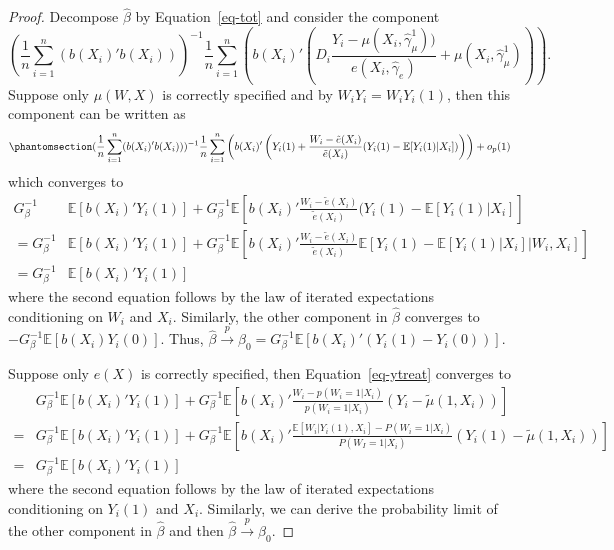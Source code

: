 \documentclass[
  12pt,
  12pt]{article}
\numberwithin{equation}{section}
\theoremstyle{definition}
\theoremstyle{plain}
\theoremstyle{plain}
\theoremstyle{remark}
\begin{document}
\begin{proof}
Decompose \(\hat\beta\) by Equation~\ref{eq-tot} and consider the
component \[
(\frac1n\sum_{i = 1}^{n}(b(X_i)'b(X_i)))^{-1}\frac1n\sum_{i = 1}^{n}\left(b(X_i)'\left(D_i\frac{Y_i - \mu(X_i, \hat\gamma^1_\mu))}{e(X_i, \hat\gamma_e)} + \mu(X_i, \hat\gamma^1_\mu)\right)\right).
\] Suppose only \(\mu(W, X)\) is correctly specified and by
\(W_iY_i = W_iY_i(1)\), then this component can be written as
\begin{equation}\phantomsection\label{eq-ytreat}{
(\frac1n\sum_{i = 1}^{n}(b(X_i)'b(X_i)))^{-1}\frac1n\sum_{i = 1}^{n}\left(b(X_i)'\left(Y_i(1) + \frac{W_i - \tilde{e}(X_i)}{\tilde{e}(X_i)}(Y_i(1) - \mathbb{E}[Y_i(1)|X_i])\right)\right) + o_p(1)
}\end{equation} which converges to \[
\begin{aligned}
G_\beta^{-1}&\mathbb{E}[b(X_i)'Y_i(1)] + G_\beta^{-1}\mathbb{E}\left[b(X_i)'\frac{W_i - \tilde{e}(X_i)}{\tilde{e}(X_i)}(Y_i(1) - \mathbb{E}[Y_i(1)|X_i]\right] \\
= G_\beta^{-1}&\mathbb{E}[b(X_i)'Y_i(1)] + G_\beta^{-1}\mathbb{E}\left[b(X_i)'\frac{W_i - \tilde{e}(X_i)}{\tilde{e}(X_i)}\mathbb{E}[Y_i(1) - \mathbb{E}[Y_i(1) \vert X_i] \vert W_i, X_i]\right] \\
= G_\beta^{-1}&\mathbb{E}[b(X_i)'Y_i(1)]
\end{aligned}
\] where the second equation follows by the law of iterated expectations
conditioning on \(W_i\) and \(X_i\). Similarly, the other component in
\(\hat\beta\) converges to \(-G_\beta^{-1}\mathbb{E}[b(X_i)Y_i(0)]\).
Thus,
\(\hat\beta \xrightarrow{p} \beta_0 = G_\beta^{-1}\mathbb{E}[b(X_i)'(Y_i(1) - Y_i(0))]\).

Suppose only \(e(X)\) is correctly specified, then
Equation~\ref{eq-ytreat} converges to \[
\begin{aligned}
&G_\beta^{-1}\mathbb{E}[b(X_i)'Y_i(1)] + G_\beta^{-1}\mathbb{E}\left[b(X_i)'\frac{W_i - p(W_i = 1|X_i)}{p(W_i = 1|X_i)}(Y_i - \tilde{\mu}(1, X_i))\right] \\
= &G_\beta^{-1}\mathbb{E}[b(X_i)'Y_i(1)] + G_\beta^{-1}\mathbb{E}[b(X_i)'\frac{\mathbb{E}[W_i|Y_i(1), X_i] - P(W_i = 1|X_i)}{P(W_I = 1|X_i)}(Y_i(1) - \tilde{\mu}(1, X_i))] \\
= &G_\beta^{-1}\mathbb{E}[b(X_i)'Y_i(1)]
\end{aligned}
\] where the second equation follows by the law of iterated expectations
conditioning on \(Y_i(1)\) and \(X_i\). Similarly, we can derive the
probability limit of the other component in \(\hat\beta\) and then
\(\hat\beta \xrightarrow{p} \beta_0\).
\end{proof}
\end{document}
